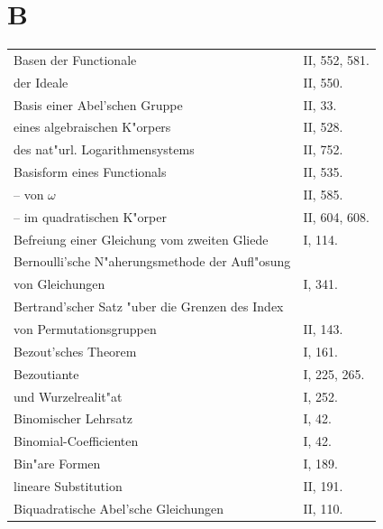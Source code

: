 \documentclass[10pt,a4paper]{article}
\theoremstyle{weberstyle}
\begin{document}
\section*{B}
\begin{flushleft}
\begin{tabular}{@{}p{8cm}l@{}}
Basen der Functionale & II, 552, 581.\\
\quad der Ideale & II, 550.\\[4pt]
Basis einer Abel'schen Gruppe & II, 33.\\
\quad eines algebraischen K"orpers & II, 528.\\
\quad des nat"url. Logarithmensystems & II, 752.\\[4pt]
Basisform eines Functionals & II, 535.\\
\quad -- \quad von $\omega$ & II, 585.\\
\quad -- \quad im quadratischen K"orper & II, 604, 608.\\[4pt]
Befreiung einer Gleichung vom zweiten Gliede & I, 114.\\[4pt]
Bernoulli'sche N"aherungsmethode der Aufl"osung\\
\quad von Gleichungen & I, 341.\\[4pt]
Bertrand'scher Satz "uber die Grenzen des Index\\
\quad von Permutationsgruppen & II, 143.\\[4pt]
Bezout'sches Theorem & I, 161.\\[4pt]
Bezoutiante & I, 225, 265.\\
\quad und Wurzelrealit"at & I, 252.\\[4pt]
Binomischer Lehrsatz & I, 42.\\[4pt]
Binomial-Coefficienten & I, 42.\\[4pt]
Bin"are Formen & I, 189.\\
\quad lineare Substitution & II, 191.\\[4pt]
Biquadratische Abel'sche Gleichungen & II, 110.
\end{tabular}
\end{flushleft}

\newpage
\end{document}
